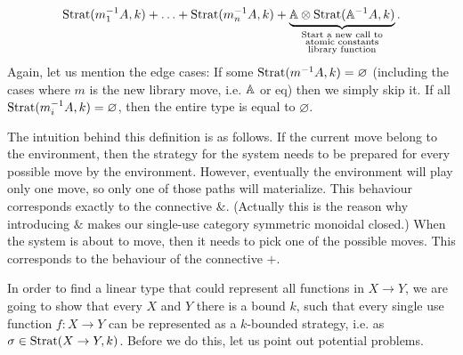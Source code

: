 \begin{definition}
\begin{itemize}
\begin{itemize}
               \begin{align*}
                \text{Strat}(m_1^{-1}A, k) + \ldots + \text{Strat}(m_n^{-1}A, k) + \underbrace{\mathbb A \otimes \text{Strat}(\mathbb A^{-1}A, k)}_{\substack{\textrm{Start a new call to}\\
                \textrm{atomic constants}\\
                \textrm{library function}}}.
               \end{align*}
               Again, let us mention the edge cases: If some $\text{Strat}(m^{-1}A, k) = \varnothing$ (including the cases where $m$ is the new library move, i.e. $\mathbb A$ or $\text{eq}$)
               then we simply skip it. If all $\text{Strat}(m_i^{-1}A, k) = \varnothing$, then the entire type is equal to $\varnothing$. 
    \end{itemize}
\end{itemize}
\end{definition}
The intuition behind this definition is as follows. If the current move belong to the environment, then the strategy 
for the system needs to be prepared for every possible move by the environment. However, eventually the environment 
will play only one move, so only one of those paths will materialize. This behaviour corresponds exactly to the connective $\&$. 
(Actually this is the reason why introducing $\&$ makes our single-use category symmetric monoidal closed.) 
When the system is about to move, then it needs to pick one of the possible moves. This corresponds to the behaviour of the connective $+$.

In order to find a linear type that could represent all functions in $X \to Y$, we are going to show 
that every $X$ and $Y$ there is a bound $k$, such that every single use function $f : X \to Y$
can be represented as a $k$-bounded strategy, i.e. as $\sigma \in \text{Strat}(X \to Y, k)$. Before we do this, 
let us point out potential problems. 


